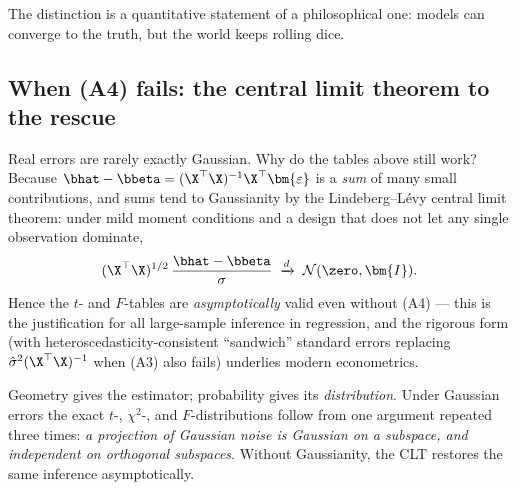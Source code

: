 The distinction is a quantitative statement of a philosophical one: models can converge to the truth, but the world keeps rolling dice.

\subsection{When (A4) fails: the central limit theorem to the rescue}

Real errors are rarely exactly Gaussian. Why do the tables above still work? Because $\bhat - \bbeta = (\X^\top\X)^{-1}\X^\top \bm{\varepsilon}$ is a \emph{sum} of many small contributions, and sums tend to Gaussianity by the Lindeberg--L\'evy central limit theorem: under mild moment conditions and a design that does not let any single observation dominate,
\[
  (\X^\top \X)^{1/2} \, \frac{\bhat - \bbeta}{\sigma} \;\xrightarrow{d}\; \mathcal{N}(\zero, \bm{I}).
\]
Hence the $t$- and $F$-tables are \emph{asymptotically} valid even without (A4) — this is the justification for all large-sample inference in regression, and the rigorous form (with heteroscedasticity-consistent ``sandwich'' standard errors replacing $\hat\sigma^2(\X^\top\X)^{-1}$ when (A3) also fails) underlies modern econometrics.

\begin{keybox}
Geometry gives the estimator; probability gives its \emph{distribution}. Under Gaussian errors the exact $t$-, $\chi^2$-, and $F$-distributions follow from one argument repeated three times: \emph{a projection of Gaussian noise is Gaussian on a subspace, and independent on orthogonal subspaces}. Without Gaussianity, the CLT restores the same inference asymptotically.
\end{keybox}
